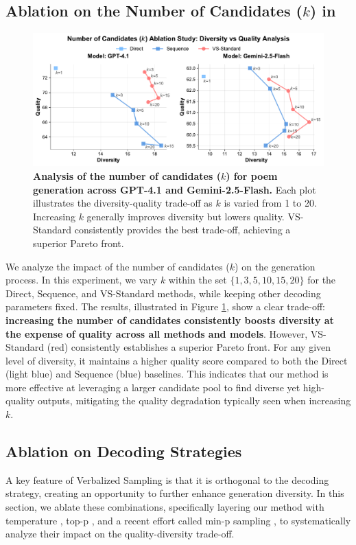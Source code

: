 \subsection{Ablation on the Number of Candidates ($k$) in \ours}\label{sec:ablation_number_candidates}
\begin{figure}[ht]
    \centering
    \includegraphics[width=1.0\linewidth]{figures/ablation/decoding_strategies/num_samples_ablation_comparison.pdf}
    \caption{\textbf{Analysis of the number of candidates ($k$) for poem generation across GPT-4.1 and Gemini-2.5-Flash.} Each plot illustrates the diversity-quality trade-off as $k$ is varied from 1 to 20. Increasing $k$ generally improves diversity but lowers quality. VS-Standard consistently provides the best trade-off, achieving a superior Pareto front.}
    \label{fig:num_candidates_ablation}
\end{figure}

We analyze the impact of the number of candidates ($k$) on the generation process. In this experiment, we vary $k$ within the set $\{1, 3, 5, 10, 15, 20\}$ for the Direct, Sequence, and VS-Standard methods, while keeping other decoding parameters fixed. The results, illustrated in Figure \ref{fig:num_candidates_ablation}, show a clear trade-off: \textbf{increasing the number of candidates consistently boosts diversity at the expense of quality across all methods and models}. However, VS-Standard (red) consistently establishes a superior Pareto front. For any given level of diversity, it maintains a higher quality score compared to both the Direct (light blue) and Sequence (blue) baselines. This indicates that our method is more effective at leveraging a larger candidate pool to find diverse yet high-quality outputs, mitigating the quality degradation typically seen when increasing $k$.

\subsection{Ablation on Decoding Strategies}\label{sec:ablation_decoding_strategies}
A key feature of Verbalized Sampling is that it is orthogonal to the decoding strategy, creating an opportunity to further enhance generation diversity. In this section, we ablate these combinations, specifically layering our method with temperature \citep{ACKLEY1985147}, top-p \citep{holtzman2020curiouscaseneuraltext}, and a recent effort called min-p sampling \citep{nguyen_turning_2025}, to systematically analyze their impact on the quality-diversity trade-off.


